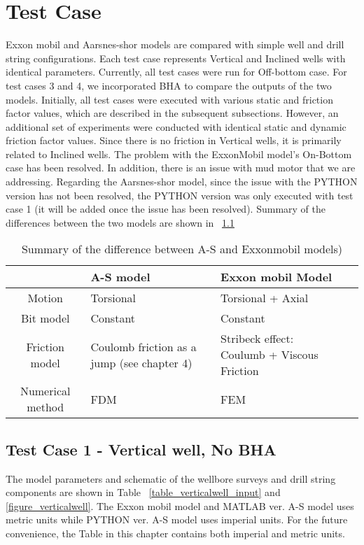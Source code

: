 \chapter{Test Case}
Exxon mobil and Aarsnes-shor models are compared with simple well and drill string configurations. Each test case represents Vertical and Inclined wells with identical parameters. Currently, all test cases were run for Off-bottom case. For test cases 3 and 4, we incorporated BHA to compare the outputs of the two models. Initially, all test cases were executed with various static and friction factor values, which are described in the subsequent subsections. However, an additional set of experiments were conducted with identical static and dynamic friction factor values. Since there is no friction in Vertical wells, it is primarily related to Inclined wells. The problem with the ExxonMobil model's On-Bottom case has been resolved. In addition, there is an issue with mud motor that we are addressing. Regarding the Aarsnes-shor model, since the issue with the PYTHON version has not been resolved, the PYTHON version was only executed with test case 1 (it will be added once the issue has been resolved). Summary of the differences between the two models are shown in \tablename~\ref{table_model_difference}

\begin{table}[!hbt]
\centering
\begin{tabular}{|c|p{1.8in}|p{1.8in}|c|}
\hline 
 & A-S model & Exxon mobil Model\\
\hline
Motion & Torsional & Torsional + Axial\\                                                              
\hline
Bit model & Constant & Constant \\                                                  
\hline
Friction model & Coulomb friction as a jump (see chapter 4) & Stribeck  effect: Coulumb + Viscous Friction \\                                                  
\hline
Numerical method & FDM & FEM\\      
\hline                                                 
\end{tabular}
\caption[Summary of the difference between two models]{Summary of the difference between A-S and Exxonmobil models)}\label{table_model_difference}
\end{table}



\section{Test Case 1 - Vertical well, No BHA}
The model parameters and schematic of the wellbore surveys and drill string components are shown in Table \tablename~\ref{table_verticalwell_input} and \ref{figure_verticalwell}. The Exxon mobil model and MATLAB ver. A-S model uses metric units while PYTHON ver. A-S model uses imperial units. For the future convenience, the Table in this chapter contains both imperial and metric units.


